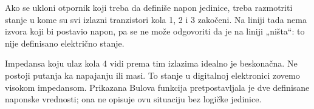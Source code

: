 Ako se ukloni otpornik koji treba da definiše napon jedinice, treba razmotriti stanje u kome su svi izlazni tranzistori kola 1, 2 i 3 zakočeni. Na liniji tada nema izvora koji bi postavio napon, pa se ne može odgovoriti da je na liniji „ništa“: to nije definisano električno stanje.

Impedansa koju ulaz kola 4 vidi prema tim izlazima idealno je beskonačna. Ne postoji putanja ka napajanju ili masi. To stanje u digitalnoj elektronici zovemo visokom impedansom. Prikazana Bulova funkcija pretpostavljala je dve definisane naponske vrednosti; ona ne opisuje ovu situaciju bez logičke jedinice.
